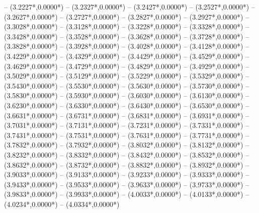 {	-- ({3.2227*\dx},{0.0000*\dy})
	-- ({3.2327*\dx},{0.0000*\dy})
	-- ({3.2427*\dx},{0.0000*\dy})
	-- ({3.2527*\dx},{0.0000*\dy})
	-- ({3.2627*\dx},{0.0000*\dy})
	-- ({3.2727*\dx},{0.0000*\dy})
	-- ({3.2827*\dx},{0.0000*\dy})
	-- ({3.2927*\dx},{0.0000*\dy})
	-- ({3.3028*\dx},{0.0000*\dy})
	-- ({3.3128*\dx},{0.0000*\dy})
	-- ({3.3228*\dx},{0.0000*\dy})
	-- ({3.3328*\dx},{0.0000*\dy})
	-- ({3.3428*\dx},{0.0000*\dy})
	-- ({3.3528*\dx},{0.0000*\dy})
	-- ({3.3628*\dx},{0.0000*\dy})
	-- ({3.3728*\dx},{0.0000*\dy})
	-- ({3.3828*\dx},{0.0000*\dy})
	-- ({3.3928*\dx},{0.0000*\dy})
	-- ({3.4028*\dx},{0.0000*\dy})
	-- ({3.4128*\dx},{0.0000*\dy})
	-- ({3.4229*\dx},{0.0000*\dy})
	-- ({3.4329*\dx},{0.0000*\dy})
	-- ({3.4429*\dx},{0.0000*\dy})
	-- ({3.4529*\dx},{0.0000*\dy})
	-- ({3.4629*\dx},{0.0000*\dy})
	-- ({3.4729*\dx},{0.0000*\dy})
	-- ({3.4829*\dx},{0.0000*\dy})
	-- ({3.4929*\dx},{0.0000*\dy})
	-- ({3.5029*\dx},{0.0000*\dy})
	-- ({3.5129*\dx},{0.0000*\dy})
	-- ({3.5229*\dx},{0.0000*\dy})
	-- ({3.5329*\dx},{0.0000*\dy})
	-- ({3.5430*\dx},{0.0000*\dy})
	-- ({3.5530*\dx},{0.0000*\dy})
	-- ({3.5630*\dx},{0.0000*\dy})
	-- ({3.5730*\dx},{0.0000*\dy})
	-- ({3.5830*\dx},{0.0000*\dy})
	-- ({3.5930*\dx},{0.0000*\dy})
	-- ({3.6030*\dx},{0.0000*\dy})
	-- ({3.6130*\dx},{0.0000*\dy})
	-- ({3.6230*\dx},{0.0000*\dy})
	-- ({3.6330*\dx},{0.0000*\dy})
	-- ({3.6430*\dx},{0.0000*\dy})
	-- ({3.6530*\dx},{0.0000*\dy})
	-- ({3.6631*\dx},{0.0000*\dy})
	-- ({3.6731*\dx},{0.0000*\dy})
	-- ({3.6831*\dx},{0.0000*\dy})
	-- ({3.6931*\dx},{0.0000*\dy})
	-- ({3.7031*\dx},{0.0000*\dy})
	-- ({3.7131*\dx},{0.0000*\dy})
	-- ({3.7231*\dx},{0.0000*\dy})
	-- ({3.7331*\dx},{0.0000*\dy})
	-- ({3.7431*\dx},{0.0000*\dy})
	-- ({3.7531*\dx},{0.0000*\dy})
	-- ({3.7631*\dx},{0.0000*\dy})
	-- ({3.7731*\dx},{0.0000*\dy})
	-- ({3.7832*\dx},{0.0000*\dy})
	-- ({3.7932*\dx},{0.0000*\dy})
	-- ({3.8032*\dx},{0.0000*\dy})
	-- ({3.8132*\dx},{0.0000*\dy})
	-- ({3.8232*\dx},{0.0000*\dy})
	-- ({3.8332*\dx},{0.0000*\dy})
	-- ({3.8432*\dx},{0.0000*\dy})
	-- ({3.8532*\dx},{0.0000*\dy})
	-- ({3.8632*\dx},{0.0000*\dy})
	-- ({3.8732*\dx},{0.0000*\dy})
	-- ({3.8832*\dx},{0.0000*\dy})
	-- ({3.8932*\dx},{0.0000*\dy})
	-- ({3.9033*\dx},{0.0000*\dy})
	-- ({3.9133*\dx},{0.0000*\dy})
	-- ({3.9233*\dx},{0.0000*\dy})
	-- ({3.9333*\dx},{0.0000*\dy})
	-- ({3.9433*\dx},{0.0000*\dy})
	-- ({3.9533*\dx},{0.0000*\dy})
	-- ({3.9633*\dx},{0.0000*\dy})
	-- ({3.9733*\dx},{0.0000*\dy})
	-- ({3.9833*\dx},{0.0000*\dy})
	-- ({3.9933*\dx},{0.0000*\dy})
	-- ({4.0033*\dx},{0.0000*\dy})
	-- ({4.0133*\dx},{0.0000*\dy})
	-- ({4.0234*\dx},{0.0000*\dy})
	-- ({4.0334*\dx},{0.0000*\dy})
}
